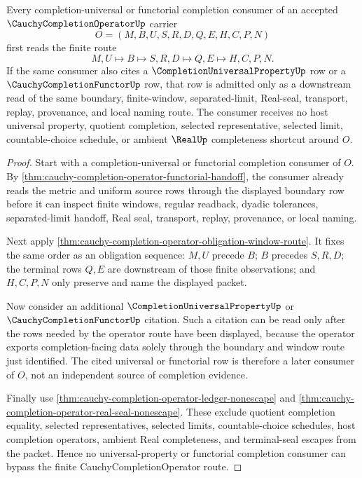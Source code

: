 \begin{theorem}
\label{thm:cauchy-completion-operator-universal-factorization}
Every completion-universal or functorial completion consumer of an accepted $\CauchyCompletionOperatorUp$ carrier
$$
O=(M,B,U,S,R,D,Q,E,H,C,P,N)
$$
first reads the finite route
$$
M,U \longmapsto B \longmapsto S,R,D \longmapsto Q,E \longmapsto H,C,P,N .
$$
If the same consumer also cites a $\CompletionUniversalPropertyUp$ row or a $\CauchyCompletionFunctorUp$ row, that row is admitted only as a downstream read of the same boundary, finite-window, separated-limit, Real-seal, transport, replay, provenance, and local naming route. The consumer receives no host universal property, quotient completion, selected representative, selected limit, countable-choice schedule, or ambient $\RealUp$ completeness shortcut around $O$.
\end{theorem}
\begin{proof}
Start with a completion-universal or functorial completion consumer of $O$. By \autoref{thm:cauchy-completion-operator-functorial-handoff}, the consumer already reads the metric and uniform source rows through the displayed boundary row before it can inspect finite windows, regular readback, dyadic tolerances, separated-limit handoff, Real seal, transport, replay, provenance, or local naming.

Next apply \autoref{thm:cauchy-completion-operator-obligation-window-route}. It fixes the same order as an obligation sequence: $M,U$ precede $B$; $B$ precedes $S,R,D$; the terminal rows $Q,E$ are downstream of those finite observations; and $H,C,P,N$ only preserve and name the displayed packet.

Now consider an additional $\CompletionUniversalPropertyUp$ or $\CauchyCompletionFunctorUp$ citation. Such a citation can be read only after the rows needed by the operator route have been displayed, because the operator exports completion-facing data solely through the boundary and window route just identified. The cited universal or functorial row is therefore a later consumer of $O$, not an independent source of completion evidence.

Finally use \autoref{thm:cauchy-completion-operator-ledger-nonescape} and \autoref{thm:cauchy-completion-operator-real-seal-nonescape}. These exclude quotient completion equality, selected representatives, selected limits, countable-choice schedules, host completion operators, ambient Real completeness, and terminal-seal escapes from the packet. Hence no universal-property or functorial completion consumer can bypass the finite CauchyCompletionOperator route.
\end{proof}

